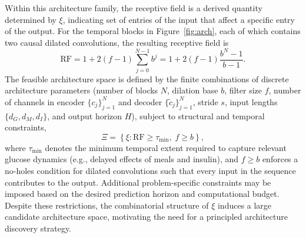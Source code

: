 \documentclass[preprint,12pt]{elsarticle}
\begin{document}
%

Within this architecture family, the receptive field is a derived quantity determined by \(\xi\), indicating set of entries of the input that affect a specific entry of the output. For the temporal blocks in Figure~\ref{fig:arch}, each of which contains two causal dilated convolutions, the resulting receptive field is
\begin{equation}
\mathrm{RF}
=
1+2(f-1)\sum_{j=0}^{N-1} b^j
=
1+2(f-1)\frac{b^N-1}{b-1}.
\label{eq:rf_closed}
\end{equation}
%
The feasible architecture space is defined by the finite combinations of discrete architecture parameters (number of blocks $N$, dilation base $b$, filter size $f$, number of channels in encoder $\{c_j\}_{j=1}^N$ and decoder $\{\tilde{c}_j\}_{j=1}^N$, stride $s$, input lengths $\{d_G, d_M, d_I\}$, and output horizon $H$), subject to structural and temporal constraints,
%
\begin{equation}
\Xi
=
\left\{
\xi :
\mathrm{RF}\geq \tau_{\min},
\;
f \geq b
\right\},
\label{eq:feasible_space}
\end{equation}
where \(\tau_{\min}\) denotes the minimum temporal extent required to capture relevant glucose dynamics (e.g., delayed effects of meals and insulin), and \(f \geq b\) enforces a no-holes condition for dilated convolutions such that every input in the sequence contributes to the output. Additional problem-specific constraints may be imposed based on the desired prediction horizon and computational budget. Despite these restrictions, the combinatorial structure of \(\xi\) induces a large candidate architecture space, motivating the need for a principled architecture discovery strategy.

\end{document}
